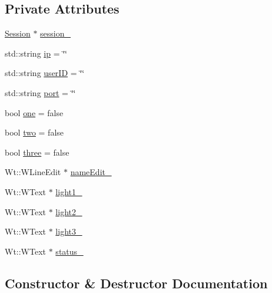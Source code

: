 \subsection*{Private Attributes}
\begin{DoxyCompactItemize}
\item 
\hyperlink{classSession}{Session} $\ast$ \hyperlink{classGroupsControlWidget_a22dc704f954395ff53d67c51dbec933f}{session\+\_\+}
\item 
std\+::string \hyperlink{classGroupsControlWidget_abf7a784bfb01b064e2bb2064c8e3e3a3}{ip} = \char`\"{}\char`\"{}
\item 
std\+::string \hyperlink{classGroupsControlWidget_a5254fd01a7e3c5d56515d1161f392b09}{user\+ID} = \char`\"{}\char`\"{}
\item 
std\+::string \hyperlink{classGroupsControlWidget_aad63d0d29a731819e47f1cd2974511ed}{port} = \char`\"{}\char`\"{}
\item 
bool \hyperlink{classGroupsControlWidget_a83ab8b39f8c267cc46ad79b38e648618}{one} = false
\item 
bool \hyperlink{classGroupsControlWidget_a4d0f1619ed1d0976fc48ea38262a5e5c}{two} = false
\item 
bool \hyperlink{classGroupsControlWidget_a441299ffc41342f9c91d3d6f319732ed}{three} = false
\item 
Wt\+::\+W\+Line\+Edit $\ast$ \hyperlink{classGroupsControlWidget_aecb5c19707326e3ec3c5b140da32e62d}{name\+Edit\+\_\+}
\item 
Wt\+::\+W\+Text $\ast$ \hyperlink{classGroupsControlWidget_a66968632cf6001c9aeb5e227d9d06177}{light1\+\_\+}
\item 
Wt\+::\+W\+Text $\ast$ \hyperlink{classGroupsControlWidget_aadce8705e32e8559e28feb2cfdae23e8}{light2\+\_\+}
\item 
Wt\+::\+W\+Text $\ast$ \hyperlink{classGroupsControlWidget_a9846da1c58d8430074935daeea6b385b}{light3\+\_\+}
\item 
Wt\+::\+W\+Text $\ast$ \hyperlink{classGroupsControlWidget_aa20f4ee341f245754611fa4494b38ecd}{status\+\_\+}
\end{DoxyCompactItemize}


\subsection{Constructor \& Destructor Documentation}
